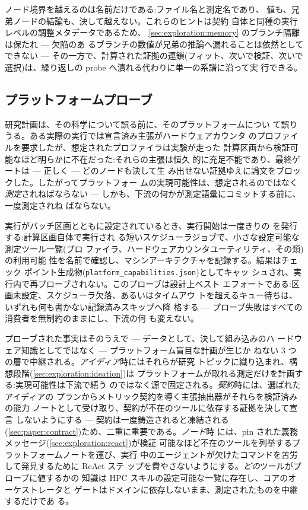 ノード境界を越えるのは名前だけである:ファイル名と測定名であり、
値も、兄弟ノードの結論も、決して越えない。これらのヒントは契約
自体と同種の実行レベルの調整メタデータであるため、
\cref{sec:exploration:memory} のブランチ隔離は保たれ — 欠陥のあ
るブランチの数値が兄弟の推論へ漏れることは依然としてできない —
その一方で、計算された証拠の連鎖(フィット、次いで検証、次いで
選択)は、繰り返しの probe へ潰れる代わりに単一の系譜に沿って実
行できる。

\subsection{プラットフォームプローブ}\label{sec:exploration:platform-probe}

研究計画は、その科学について誤る前に、そのプラットフォームについ
て誤りうる。ある実際の実行では宣言済み主張がハードウェアカウンタ
のプロファイルを要求したが、想定されたプロファイラは実験が走った
計算区画から検証可能なほど明らかに不在だった:それらの主張は恒久
的に充足不能であり、最終ゲートは — 正しく — どのノードも決して生
み出せない証拠ゆえに論文をブロックした。したがってプラットフォー
ムの実現可能性は、想定されるのではなく\emph{測定}されねばならない
— しかも、下流の何かが測定語彙にコミットする前に、一度測定されね
ばならない。

実行がバッチ区画とともに設定されているとき、実行開始は一度きりの
を発行する:計算区画自体で実行され
る短いスケジューラジョブで、小さな設定可能な測定ツール一覧(プロ
ファイラ、ハードウェアカウンタユーティリティ、その類)の利用可能
性を名前で確認し、マシンアーキテクチャを記録する。結果はチェック
ポイント生成物(\texttt{platform\_capabilities.json})としてキャッ
シュされ、実行内で再プローブされない。このプローブは設計上ベスト
エフォートである:区画未設定、スケジューラ欠落、あるいはタイムアウ
トを超えるキュー待ちは、いずれも何も書かない記録済みスキップへ降
格する — プローブ失敗はすべての消費者を無制約のままにし、下流の何
も変えない。

プローブされた事実はそのうえで — データとして、決して組み込みのハ
ードウェア知識としてではなく — プラットフォーム盲目な計画が生じか
ねない 3 つの層で中継される。\emph{アイディア}時にはそれらが研究
トピックに織り込まれ、構想段階(\cref{sec:exploration:ideation})は
プラットフォームが取れる測定だけを計画する:実現可能性は下流で繕う
のではなく源で固定される。\emph{契約}時には、選ばれたアイディアの
プランからメトリック契約を導く主張抽出器がそれらを検証済みの能力
ノートとして受け取り、契約が不在のツールに依存する証拠を決して宣言
しないようにする — 契約は一度鋳造されると凍結される
(\cref{sec:paper:contract})ため、二重に重要である。\emph{ノード}時
には、pin された義務メッセージ(\cref{sec:exploration:react})が検証
可能なほど不在のツールを列挙するプラットフォームノートを運び、実行
中のエージェントが欠けたコマンドを苦労して発見するために ReAct ステ
ップを費やさないようにする。\emph{どの}ツールがプローブに値するかの
知識は HPC スキルの設定可能な一覧に存在し、コアのオーケストレータと
ゲートはドメインに依存しないまま、測定されたものを中継するだけであ
る。

